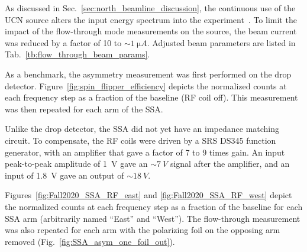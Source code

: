 As discussed in Sec.~\ref{sec:north_beamline_discussion}, the continuous use of the UCN source alters the input energy spectrum into the experiment~\cite{anghel_solid_2018}. To limit the impact of the flow-through mode measurements on the source, the beam current was reduced by a factor of 10 to $\sim \qty{1}{\micro A}$. Adjusted beam parameters are listed in Tab.~\ref{tb:flow_through_beam_params}.

As a benchmark, the asymmetry measurement was first performed on the drop detector.  Figure~\ref{fig:spin_flipper_efficiency} depicts the normalized \ucn counts at each frequency step as a fraction of the baseline (RF coil off). This measurement was then repeated for each arm of the SSA.

Unlike the drop detector, the SSA did not yet have an impedance matching circuit. To compensate, the RF coils were driven by a SRS DS345 function generator, with an amplifier that gave a factor of 7 to 9 times gain. An input peak-to-peak amplitude of \qty{1}{V} gave an $\sim\qty{7}{V}$ signal after the amplifier, and an input of \qty{1.8}{V} gave an output of $\sim\qty{18}{V}$.

Figures~\ref{fig:Fall2020_SSA_RF_east} and \ref{fig:Fall2020_SSA_RF_west} depict the  normalized \ucn counts at each frequency step as a fraction of the baseline for each SSA arm (arbitrarily named ``East'' and ``West''). The flow-through measurement was also repeated for each arm with the polarizing foil on the opposing arm removed (Fig.~\ref{fig:SSA_asym_one_foil_out}).





